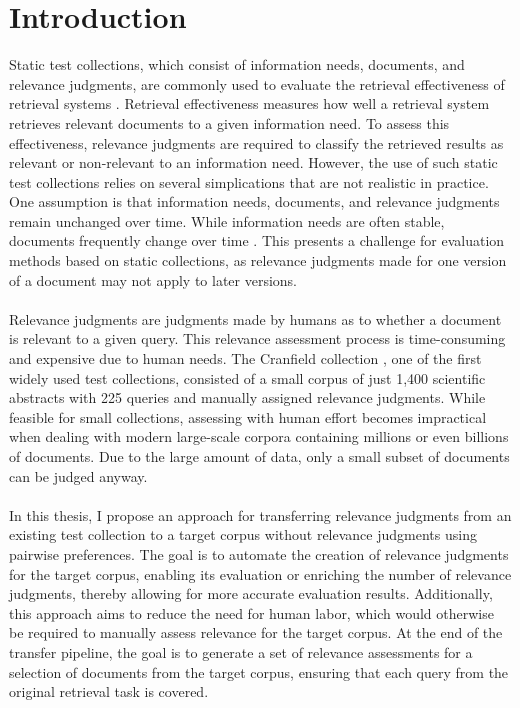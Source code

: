 \chapter{Introduction}\label{introduction} 

Static test collections, which consist of information needs, documents, and relevance judgments, are commonly used to evaluate the retrieval effectiveness of retrieval systems \citep{sanderson:2010}. Retrieval effectiveness measures how well a retrieval system retrieves relevant documents to a given information need. To assess this effectiveness, relevance judgments are required to classify the retrieved results as relevant or non-relevant to an information need. However, the use of such static test collections relies on several simplications that are not realistic in practice. One assumption is that information needs, documents, and relevance judgments remain unchanged over time. While information needs are often stable, documents frequently change over time \citep{cho:2000}. This presents a challenge for evaluation methods based on static collections, as relevance judgments made for one version of a document may not apply to later versions.
\\\\
Relevance judgments are judgments made by humans as to whether a document is relevant to a given query. This relevance assessment process is time-consuming and expensive due to human needs. The Cranfield collection \citep{cleverdon:91}, one of the first widely used test collections, consisted of a small corpus of just 1,400 scientific abstracts with 225 queries and manually assigned relevance judgments. While feasible for small collections, assessing with human effort becomes impractical when dealing with modern large-scale corpora containing millions or even billions of documents. Due to the large amount of data, only a small subset of documents can be judged anyway. 
\\\\
In this thesis, I propose an approach for transferring relevance judgments from an existing test collection to a target corpus without relevance judgments using pairwise preferences. The goal is to automate the creation of relevance judgments for the target corpus, enabling its evaluation or enriching the number of relevance judgments, thereby allowing for more accurate evaluation results. Additionally, this approach aims to reduce the need for human labor, which would otherwise be required to manually assess relevance for the target corpus. At the end of the transfer pipeline, the goal is to generate a set of relevance assessments for a selection of documents from the target corpus, ensuring that each query from the original retrieval task is covered.
